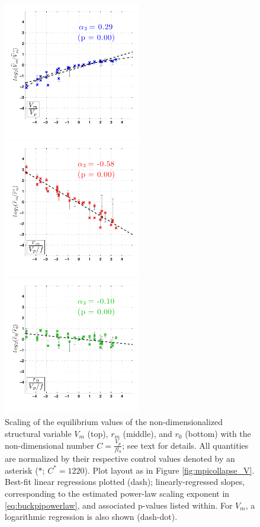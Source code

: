 \documentclass[12pt]{article}
\begin{document}
\begin{figure}[h!]
\centering
  \noindent\includegraphics[width=6cm,height=6cm]{FIGURES_TC_RCE_equilibrium_v2.0/Fig7a_Nondimensional_scaling_V.pdf}
  
  \noindent\includegraphics[width=6cm,height=6cm]{FIGURES_TC_RCE_equilibrium_v2.0/Fig7b_Nondimensional_scaling_rm.pdf}
  
  \noindent\includegraphics[width=6cm,height=6cm]{FIGURES_TC_RCE_equilibrium_v2.0/Fig7c_Nondimensional_scaling_r0.pdf}

\caption{Scaling of the equilibrium values of the non-dimensionalized structural variable $V_m$ (top), $r_m$ (middle), and $r_0$ (bottom) with the non-dimensional number $C = \frac{V_p}{fl_h}$; see text for details. All quantities are normalized by their respective control values denoted by an asterisk ($*$; $C^* = 1220$). Plot layout as in Figure \ref{fig:mpicollapse_V}.  Best-fit linear regressions plotted (dash); linearly-regressed slopes, corresponding to the estimated power-law scaling exponent in \eqref{eq:buckpipowerlaw}, and associated p-values listed within. For $V_m$, a logarithmic regression is also shown (dash-dot).}
\label{fig:nondimscaling}
\end{figure}
\end{document}
